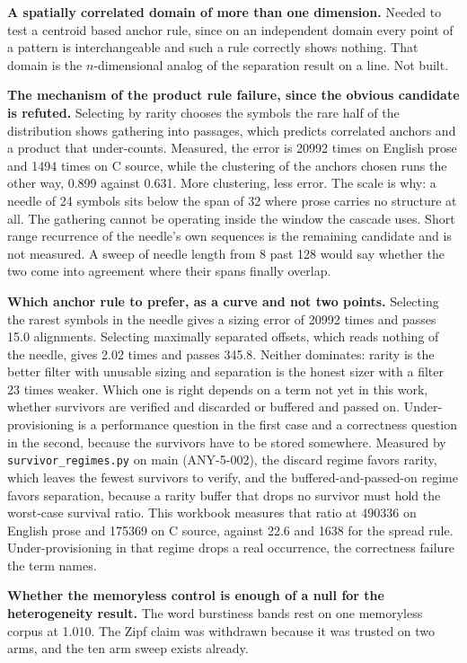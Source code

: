 \textbf{A spatially correlated domain of more than one dimension.} Needed to test a centroid based anchor rule, since on an independent domain every point of a pattern is interchangeable and such a rule correctly shows nothing. That domain is the \(n\)-dimensional analog of the separation result on a line. Not built.

\textbf{The mechanism of the product rule failure, since the obvious candidate is refuted.} Selecting by rarity chooses the symbols the rare half of the distribution shows gathering into passages, which predicts correlated anchors and a product that under-counts. Measured, the error is 20992 times on English prose and 1494 times on C source, while the clustering of the anchors chosen runs the other way, 0.899 against 0.631. More clustering, less error. The scale is why: a needle of 24 symbols sits below the span of 32 where prose carries no structure at all. The gathering cannot be operating inside the window the cascade uses. Short range recurrence of the needle's own sequences is the remaining candidate and is not measured. A sweep of needle length from 8 past 128 would say whether the two come into agreement where their spans finally overlap.

\textbf{Which anchor rule to prefer, as a curve and not two points.} Selecting the rarest symbols in the needle gives a sizing error of 20992 times and passes 15.0 alignments. Selecting maximally separated offsets, which reads nothing of the needle, gives 2.02 times and passes 345.8. Neither dominates: rarity is the better filter with unusable sizing and separation is the honest sizer with a filter 23 times weaker. Which one is right depends on a term not yet in this work, whether survivors are verified and discarded or buffered and passed on. Under-provisioning is a performance question in the first case and a correctness question in the second, because the survivors have to be stored somewhere. Measured by \texttt{survivor\_regimes.py} on main (ANY-5-002), the discard regime favors rarity, which leaves the fewest survivors to verify, and the buffered-and-passed-on regime favors separation, because a rarity buffer that drops no survivor must hold the worst-case survival ratio. This workbook measures that ratio at 490336 on English prose and 175369 on C source, against 22.6 and 1638 for the spread rule. Under-provisioning in that regime drops a real occurrence, the correctness failure the term names.

\textbf{Whether the memoryless control is enough of a null for the heterogeneity result.} The word burstiness bands rest on one memoryless corpus at 1.010. The Zipf claim was withdrawn because it was trusted on two arms, and the ten arm sweep exists already.

